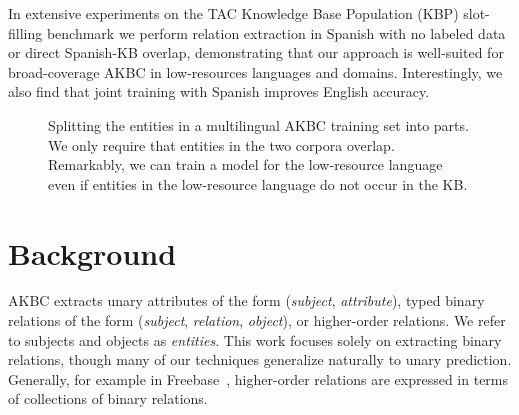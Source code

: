 In extensive experiments on the TAC Knowledge Base Population (KBP) slot-filling benchmark we perform relation extraction in Spanish with no labeled data or direct Spanish-KB overlap, demonstrating that our approach is well-suited for broad-coverage AKBC in low-resources languages and domains. Interestingly, we also find that joint training with Spanish improves English accuracy. 

\begin{figure}[h!]
\begin{center}
\caption{Splitting the entities in a multilingual AKBC training set into parts. We only require that entities in the two corpora overlap. Remarkably, we can train a model for the low-resource language even if entities in the low-resource language do not occur in the KB. \label{tab:multilingual-corpora}}

\def\firstcircle{(0,0) circle (1.5cm)}
\def\secondcircle{(0:2cm) circle (1.5cm)}
\def\midline{[line width=1pt, dashed] node[label={[label distance=-3cm]-15:in KB}] {} node[label={[label distance=-3.5cm]15:not in KB}] {} (-3,0) -- (5,0)}
\end{center}
\end{figure}

\section{Background \label{sec:background}}

AKBC extracts unary attributes of the form (\textit{subject}, \textit{attribute}), typed binary relations of the form (\textit{subject}, \textit{relation}, \textit{object}), or higher-order relations. We refer to subjects and objects as \textit{entities}. This work focuses solely on extracting binary relations, though many of our techniques generalize naturally to unary prediction. Generally, for example in Freebase~\citep{freebase}, higher-order relations are expressed in terms of collections of binary relations.

